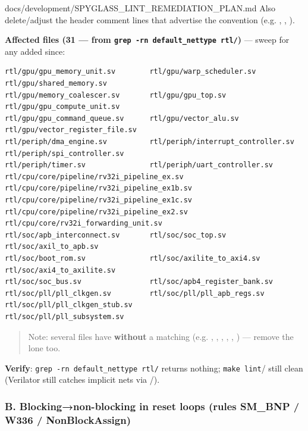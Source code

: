 \begin{relocated}{docs/development/SPYGLASS_LINT_REMEDIATION_PLAN.md}
Also delete/\allowbreak{}adjust the header comment lines that advertise
the convention (e.g. ,
,
).

\textbf{Affected files (31 --- from
\texttt{grep\ -\allowbreak{}rn\ default\_\allowbreak{}nettype\ rtl/\allowbreak{}})}
--- sweep for any added since:

\begin{lstlisting}[language={}]
rtl/gpu/gpu_memory_unit.sv        rtl/gpu/warp_scheduler.sv         rtl/gpu/shared_memory.sv
rtl/gpu/memory_coalescer.sv       rtl/gpu/gpu_top.sv                rtl/gpu/gpu_compute_unit.sv
rtl/gpu/gpu_command_queue.sv      rtl/gpu/vector_alu.sv             rtl/gpu/vector_register_file.sv
rtl/periph/dma_engine.sv          rtl/periph/interrupt_controller.sv rtl/periph/spi_controller.sv
rtl/periph/timer.sv               rtl/periph/uart_controller.sv
rtl/cpu/core/pipeline/rv32i_pipeline_ex.sv    rtl/cpu/core/pipeline/rv32i_pipeline_ex1b.sv
rtl/cpu/core/pipeline/rv32i_pipeline_ex1c.sv  rtl/cpu/core/pipeline/rv32i_pipeline_ex2.sv
rtl/cpu/core/rv32i_forwarding_unit.sv
rtl/soc/apb_interconnect.sv       rtl/soc/soc_top.sv                rtl/soc/axil_to_apb.sv
rtl/soc/boot_rom.sv               rtl/soc/axilite_to_axi4.sv        rtl/soc/axi4_to_axilite.sv
rtl/soc/soc_bus.sv                rtl/soc/apb4_register_bank.sv
rtl/soc/pll/pll_clkgen.sv         rtl/soc/pll/pll_apb_regs.sv       rtl/soc/pll/pll_clkgen_stub.sv
rtl/soc/pll/pll_subsystem.sv
\end{lstlisting}

\begin{quote}
Note: several files have  \textbf{without} a matching
 (e.g. , ,
, , ,
) --- remove the lone  too.
\end{quote}

\textbf{Verify}:
\texttt{grep\ -\allowbreak{}rn\ default\_\allowbreak{}nettype\ rtl/\allowbreak{}}
returns nothing; \texttt{make\ lint}/ still clean
(Verilator still catches implicit nets via
/).

\subsubsection{\texorpdfstring{B. Blocking→non-blocking in
 reset loops (rules SM\_BNP / W336 /
NonBlockAssign)}{B. Blocking→non-blocking in  reset loops (rules SM\_BNP / W336 / NonBlockAssign)}}\label{um:guide:spyglass-lint-remediation:b-blockingnon-blocking-in-always-ff-reset-loops-rules-sm-bnp-w336-nonblockassign}


\end{relocated}
